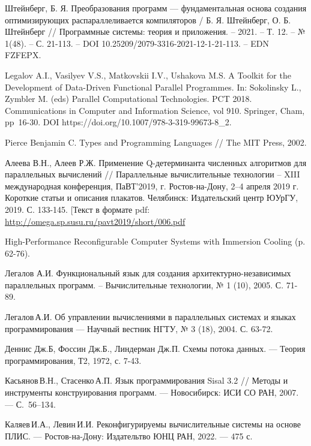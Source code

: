 \begin{thebibliography}{00}

Штейнберг, Б. Я. Преобразования программ --- фундаментальная основа создания оптимизирующих распараллеливается компиляторов / Б. Я. Штейнберг, О. Б. Штейнберг // Программные системы: теория и приложения. – 2021. – Т. 12. – № 1(48). – С. 21-113. – DOI 10.25209/2079-3316-2021-12-1-21-113. – EDN FZFEPX.

Legalov A.I., Vasilyev V.S., Matkovskii I.V., Ushakova M.S. A Toolkit for the Development of Data-Driven Functional Parallel Programmes. In: Sokolinsky L., Zymbler M. (eds) Parallel Computational Technologies. PCT 2018. Communications in Computer and Information Science, vol 910. Springer, Cham, pp 16-30. DOI https://doi.org/10.1007/978-3-319-99673-8\_2.

Pierce Benjamin C. Types and Programming Languages // The MIT Press, 2002.

Алеева В.Н., Алеев Р.Ж. Применение Q-детерминанта численных алгоритмов для параллельных вычислений // Параллельные вычислительные технологии – XIII международная конференция, ПаВТ’2019, г. Ростов-на-Дону, 2–4 апреля 2019 г. Короткие статьи и описания плакатов. Челябинск: Издательский центр ЮУрГУ, 2019. С. 133-145. [Текст в формате pdf: \url{http://omega.sp.susu.ru/pavt2019/short/006.pdf}

High-Performance Reconfigurable Computer Systems with Immersion Cooling (p. 62-76).

Легалов А.И. Функциональный язык для создания архитектурно-независимых параллельных программ. – Вычислительные технологии, № 1 (10), 2005. С. 71-89.

Легалов\,А.И. Об управлении вычислениями в параллельных системах и языках программирования --- Научный вестник НГТУ, № 3 (18), 2004. С. 63-72.

Деннис Дж.Б, Фоссин Дж.Б., Линдерман Дж.П.
Схемы потока данных. --- Теория программирования, Т2, 1972, с. 7-43.

Касьянов\,В.Н., Стасенко\,А.П. Язык программирования Sisal 3.2 // Методы и инструменты конструирования программ. --- Новосибирск: ИСИ СО РАН, 2007. --- С.~56--134.

Каляев\,И.А., Левин\,И.И. Реконфигурируемы вычислительные системы на основе ПЛИС. --- Ростов-на-Дону: Издательтво ЮНЦ РАН, 2022. --- 475 с.


\end{thebibliography}
